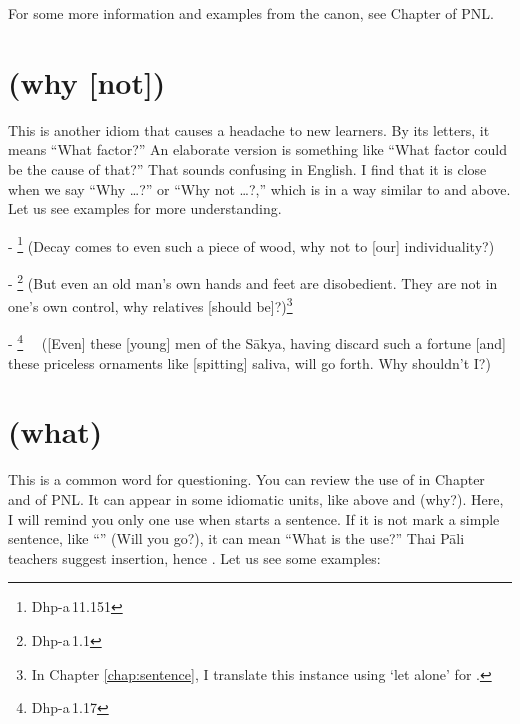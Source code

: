 For some more information and examples from the canon, see Chapter  of PNL.

{}
\section*{ (why [not])}

This is another idiom that causes a headache to new learners. By its letters, it means ``What factor?'' An elaborate version is something like ``What factor could be the cause of that?'' That sounds confusing in English. I find that it is close when we say ``Why \ldots?'' or ``Why not \ldots?,'' which is in a way similar to  and  above. Let us see examples for more understanding.

- \footnote{Dhp-a\,11.151} (Decay comes to even such a piece of wood, why not to [our] individuality?)\par
- \footnote{Dhp-a\,1.1} (But even an old man's own hands and feet are disobedient. They are not in one's own control, why relatives [should be]?)\footnote{In Chapter \ref{chap:sentence}, I translate this instance using `let alone' for .}\par
- \footnote{Dhp-a\,1.17} \ \ ([Even] these [young] men of the S\=akya, having discard such a fortune [and] these priceless ornaments like [spitting] saliva, will go forth. Why shouldn't I?)\par

{}
\section*{ (what)}

This is a common word for questioning. You can review the use of  in Chapter  and  of PNL. It can appear in some idiomatic units, like  above and  (why?). Here, I will remind you only one use when  starts a sentence. If it is not mark a simple sentence, like ``'' (Will you go?), it can mean ``What is the use?'' Thai P\=ali teachers suggest  insertion, hence . Let us see some examples:

